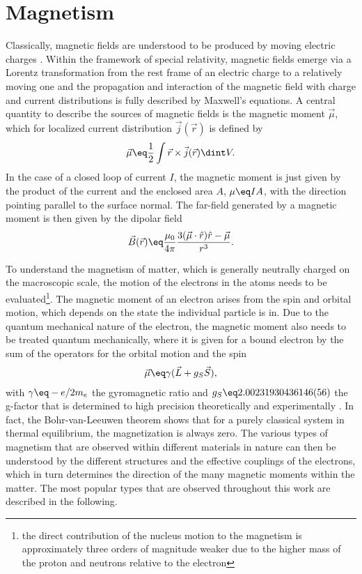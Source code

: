 \documentclass[\main/dresen_thesis.tex]{subfiles}
\begin{document}
\section{Magnetism}\label{ch:theoreticalBackground:magnetism}

  Classically, magnetic fields are understood to be produced by moving electric charges \cite{Jackson_1999_Class, Blundell_2001_Magne}.
  Within the framework of special relativity, magnetic fields emerge via a Lorentz transformation from the rest frame of an electric charge to a relatively moving one and the propagation and interaction of the magnetic field with charge and current distributions is fully described by Maxwell's equations.
  A central quantity to describe the sources of magnetic fields is the magnetic moment $\vec{\mu}$, which for localized current distribution $\vec{j}(\vec{r})$ is defined by
  \begin{align}
    \vec{\mu} \eq \frac{1}{2} \int \vec{r} \times \vec{j}(\vec{r}) \dint V .
  \end{align}
  In the case of a closed loop of current $I$, the magnetic moment is just given by the product of the current and the enclosed area $A$, $\mu \eq I A$, with the direction pointing parallel to the surface normal.
  The far-field generated by a magnetic moment is then given by the dipolar field
  \begin{align}
    \vec{B} (\vec{r}) \eq \frac{\mu_0}{4 \pi} \frac{3(\vec{\mu} \cdot \hat{r})\hat{r} - \vec{\mu}}{r^3}.
  \end{align}

  To understand the magnetism of matter, which is generally neutrally charged on the macroscopic scale, the motion of the electrons in the atoms needs to be evaluated\footnote{the direct contribution of the nucleus motion to the magnetism is approximately three orders of magnitude weaker due to the higher mass of the proton and neutrons relative to the electron}.
  The magnetic moment of an electron arises from the spin and orbital motion, which depends on the state the individual particle is in.
  Due to the quantum mechanical nature of the electron, the magnetic moment also needs to be treated quantum mechanically, where it is given for a bound electron by the sum of the operators for the orbital motion and the spin \cite{Coey_2010_Magne}
  \begin{align}
    \vec{\mu} \eq \gamma (\vec{L} + g_S \vec{S}),
  \end{align}
  with $\gamma \eq -e/2m_e$ the gyromagnetic ratio and $g_S \eq 2.00231930436146(56)$ the g-factor that is determined to high precision theoretically and experimentally \cite{Aoyama_2012_Tenth, Hanneke_2011_Cavit}.
  In fact, the Bohr-van-Leeuwen theorem shows that for a purely classical system in thermal equilibrium, the magnetization is always zero.
  The various types of magnetism that are observed within different materials in nature can then be understood by the different structures and the effective couplings of the electrons, which in turn determines the direction of the many magnetic moments within the matter.
  The most popular types that are observed throughout this work are described in the following.
\end{document}
